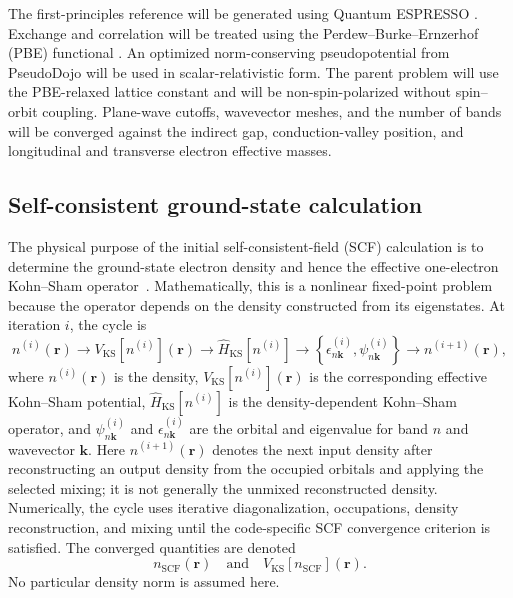 \documentclass[preprint,12pt]{elsarticle}
\begin{document}
\begin{sloppypar}
The first-principles reference will be generated using Quantum
ESPRESSO \cite{giannozzi2009}. Exchange and correlation will be treated using
the Perdew--Burke--Ernzerhof (PBE) functional \cite{perdew1996}.
An optimized norm-conserving pseudopotential from PseudoDojo
\cite{hamann2013,vansetten2018} will be used in scalar-relativistic form. The
parent problem will use the PBE-relaxed lattice constant and will be
non-spin-polarized without spin--orbit coupling. Plane-wave cutoffs, wavevector
meshes, and the number of bands will be converged against the indirect gap,
conduction-valley position, and longitudinal and transverse electron effective
masses.
\end{sloppypar}

\subsection{Self-consistent ground-state calculation}
\label{sec:scf-ground-state}

The physical purpose of the initial self-consistent-field (SCF) calculation is
to determine the ground-state electron density and hence the effective
one-electron Kohn--Sham operator~\cite{kohn1965}. Mathematically, this is a
nonlinear fixed-point problem because the operator depends on the density
constructed from its eigenstates. At iteration $i$, the cycle is
\begin{equation}
 n^{(i)}(\bm{r})
 \longrightarrow V_{\mathrm{KS}}[n^{(i)}](\bm{r})
 \longrightarrow \hat{H}_{\mathrm{KS}}[n^{(i)}]
 \longrightarrow
 \left\{\epsilon_{n\bm{k}}^{(i)},\psi_{n\bm{k}}^{(i)}\right\}
 \longrightarrow n^{(i+1)}(\bm{r}),
\label{eq:scf-cycle}
\end{equation}
where $n^{(i)}(\bm{r})$ is the density, $V_{\mathrm{KS}}[n^{(i)}](\bm{r})$
is the corresponding effective Kohn--Sham potential,
$\hat{H}_{\mathrm{KS}}[n^{(i)}]$ is the density-dependent Kohn--Sham operator,
and $\psi_{n\bm{k}}^{(i)}$ and $\epsilon_{n\bm{k}}^{(i)}$ are the orbital
and eigenvalue for band $n$ and wavevector $\bm{k}$. Here
$n^{(i+1)}(\bm{r})$ denotes the next input density after reconstructing an
output density from the occupied orbitals and applying the selected mixing; it
is not generally the unmixed reconstructed density. Numerically, the cycle uses
iterative diagonalization, occupations, density reconstruction, and mixing
until the code-specific SCF convergence criterion is satisfied. The converged
quantities are denoted
\begin{equation}
 n_{\mathrm{SCF}}(\bm{r})
 \quad\text{and}\quad
 V_{\mathrm{KS}}[n_{\mathrm{SCF}}](\bm{r}).
\label{eq:scf-density-potential}
\end{equation}
No particular density norm is assumed here.
\end{document}
